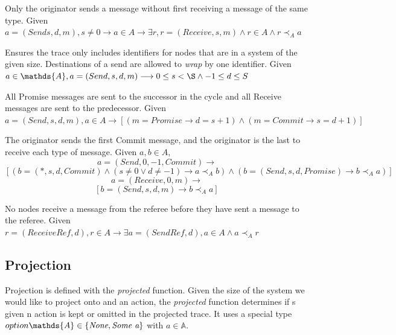\documentclass[runningheads]{llncs}
\newcommand{\action}{\mathds{A}}
\newcommand{\happensbefore}{\prec_A}
\begin{document}
\begin{definition} Only the originator sends a message without first receiving a message of the same type.
Given $a = (Send s, d, m), s \neq 0 \longrightarrow a \in A \longrightarrow \exists r, r = (Receive, s, m) \wedge r \in A \wedge r \happensbefore a$
\end{definition}

\begin{definition} Ensures the trace only includes identifiers for nodes that are in a system of the given size. Destinations of a send are allowed to \emph{wrap} by one identifier. Given $a \in \action, a = (Send, s, d, m) \longrightarrow 0 \le s < \S \wedge -1 \le d \le S$
\end{definition}

\begin{definition} All Promise messages are sent to the successor in the cycle and all Receive messages are sent to the predecessor. Given $a = (Send, s, d, m), a \in A \longrightarrow [(m = Promise \longrightarrow d = s + 1) \wedge (m = Commit \longrightarrow s = d + 1)]$
\end{definition}
\begin{definition} The originator sends the first Commit message, and the originator is the last to receive each type of message. Given $a, b \in A$,
$$ 
a = (Send, 0, -1, Commit) \longrightarrow 
$$
$$
[
(b = (*, s, d, Commit) \wedge (s \neq 0 \vee d \neq -1) \longrightarrow a \happensbefore b)
\wedge 
(b = (Send, s, d, Promise) \longrightarrow b \happensbefore a)
]
$$
$$
a = (Receive, 0, m) \longrightarrow 
$$
$$
[
b = (Send, s, d, m) \longrightarrow b \happensbefore a
]
$$
\end{definition}
\begin{definition} No nodes receive a message from the referee before they have sent a message to the referee. Given $r = (ReceiveRef, d), r \in A \longrightarrow \exists a = (SendRef, d), a \in A \wedge a \happensbefore r$
\end{definition}


\subsection{Projection}
Projection is defined with the \emph{projected} function. Given the size of the system we would like to project onto and an action, the \emph{projected} function determines if s given n action is kept or omitted in the projected trace. It uses a special type  
$option \action \in \{\emph{None}, \emph{Some a}\}$ with $a \in \action$.
\end{document}

